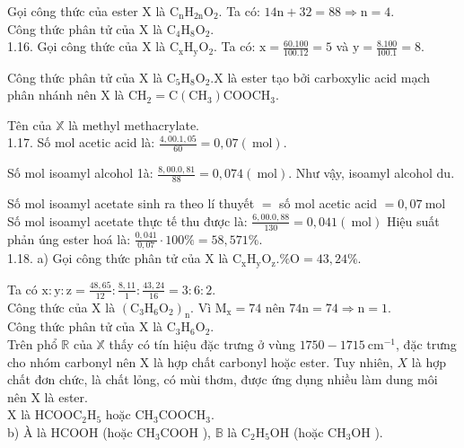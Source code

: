 \documentclass[10pt]{article}
\begin{document}
Gọi công thức của ester X là $\mathrm{C}_{\mathrm{n}} \mathrm{H}_{2 \mathrm{n}} \mathrm{O}_{2}$. Ta có: $14 \mathrm{n}+32=88 \Rightarrow \mathrm{n}=4$.\\
Công thức phân tử của X là $\mathrm{C}_{4} \mathrm{H}_{8} \mathrm{O}_{2}$.\\
1.16. Gọi công thức của X là $\mathrm{C}_{\mathrm{x}} \mathrm{H}_{\mathrm{y}} \mathrm{O}_{2}$. Ta có: $\mathrm{x}=\frac{60.100}{100.12}=5$ và $\mathrm{y}=\frac{8.100}{100.1}=8$.

Công thức phân tử của X là $\mathrm{C}_{5} \mathrm{H}_{8} \mathrm{O}_{2} . \mathrm{X}$ là ester tạo bởi carboxylic acid mạch phân nhánh nên X là $\mathrm{CH}_{2}=\mathrm{C}\left(\mathrm{CH}_{3}\right) \mathrm{COOCH}_{3}$.

Tên của $\mathbb{X}$ là methyl methacrylate.\\
1.17. Số mol acetic acid là: $\frac{4,00.1,05}{60}=0,07(\mathrm{~mol})$.

Số mol isoamyl alcohol 1à: $\frac{8,00.0,81}{88}=0,074(\mathrm{~mol})$. Như vậy, isoamyl alcohol du.

Số mol isoamyl acetate sinh ra theo lí thuyết $=$ số mol acetic acid $=0,07 \mathrm{~mol}$ Số mol isoamyl acetate thực tế thu được là: $\frac{6,00.0,88}{130}=0,041(\mathrm{~mol})$ Hiệu suất phản úng ester hoá là: $\frac{0,041}{0,07} \cdot 100 \%=58,571 \%$.\\
1.18. a) Gọi công thức phân tử của X là $\mathrm{C}_{\mathrm{x}} \mathrm{H}_{\mathrm{y}} \mathrm{O}_{\mathrm{z}} . \% \mathrm{O}=43,24 \%$.

Ta có $\mathrm{x}: \mathrm{y}: \mathrm{z}=\frac{48,65}{12}: \frac{8,11}{1}: \frac{43,24}{16}=3: 6: 2$.\\
Công thức của X là $\left(\mathrm{C}_{3} \mathrm{H}_{6} \mathrm{O}_{2}\right)_{\mathrm{n}}$. Vì $\mathrm{M}_{\mathrm{x}}=74$ nên $74 \mathrm{n}=74 \Rightarrow \mathrm{n}=1$.\\
Công thức phân tử của X là $\mathrm{C}_{3} \mathrm{H}_{6} \mathrm{O}_{2}$.\\
Trên phổ $\mathbb{R}$ của $\mathbb{X}$ thấy có tín hiệu đặc trưng ở vùng $1750-1715 \mathrm{~cm}^{-1}$, đặc trưng cho nhóm carbonyl nên X là hợp chất carbonyl hoặc ester. Tuy nhiên, $X$ là hợp chất đơn chức, là chất lỏng, có mùi thơm, được ứng dụng nhiều làm dung môi nên X là ester.\\
X là $\mathrm{HCOOC}_{2} \mathrm{H}_{5}$ hoặc $\mathrm{CH}_{3} \mathrm{COOCH}_{3}$.\\
b) À là HCOOH (hoặc $\mathrm{CH}_{3} \mathrm{COOH}$ ), $\mathbb{B}$ là $\mathrm{C}_{2} \mathrm{H}_{5} \mathrm{OH}$ (hoặc $\mathrm{CH}_{3} \mathrm{OH}$ ).
\end{document}
